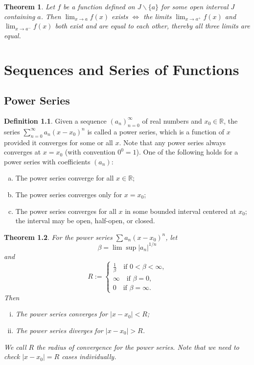 \documentclass[12pt, lettersize]{book}
\theoremstyle{plain}
\newtheorem{thm}{Theorem}[section]
\theoremstyle{definition}
\newtheorem{dfn}[thm]{Definition}
\theoremstyle{remark}
\newcommand{\R}{\mathbb{R}}
\begin{document}
		\begin{thm}\label{def:20.10}
			Let $f$ be a function defined on $J\backslash\{a\}$ for some open interval $J$ containing $a$. Then $\lim_{x\rightarrow a}f(x)$ exists $\iff$ the limits $\lim_{x\rightarrow a^+}f(x)$ and $\lim_{x\rightarrow a^-}f(x)$ both exist and are equal to each other, thereby all three limits are equal.
		\end{thm}
	
	\chapter{Sequences and Series of Functions}
	\newpage
		\section{Power Series}
		\begin{dfn}
			Given a sequence $(a_n)_{n=0}^{\infty}$ of real numbers and $x_0\in\R$, the series $\sum_{n=0}^{\infty}a_n(x-x_0)^n$ is called 
			a power series, which is a function of $x$ provided it converges for some or all $x$. Note  that any power series always converges at $x=x_0$ (with convention $0^0=1$). One of the following
			holds for a power series with coefficients $(a_n)$:
			\begin{enumerate}[(a)]
				\item The power series converge for all $x\in\R$;
				\item The power series converges only for $x=x_0$;
				\item The power series converges for all $x$ in some bounded interval centered at $x_0$; the interval may be
				open, half-open, or closed.
			\end{enumerate}
		\end{dfn}
		
		\begin{thm}\label{def:23.1}
			For the power series $\sum a_n(x-x_0)^n$, let
			\begin{displaymath}
				\beta=\lim\sup |a_n|^{1/n}
			\end{displaymath}
			and
			\begin{displaymath}
				R:=\begin{cases}
					\frac{1}{\beta}\quad\text{if $0<\beta<\infty$,}\\
					\infty\quad\text{if $\beta=0$,}\\
					0\quad\text{if $\beta=\infty$.}
				\end{cases}
			\end{displaymath} Then
			\begin{enumerate}[(i)]
				\item The power series converges for $|x-x_0|<R$;
				\item The power series diverges for $|x-x_0|>R$. 
			\end{enumerate}
			We call $R$ the \emph{radius of convergence} for the power series. Note that we need to check $|x-x_0|=R$ cases individually.
		\end{thm}
		
\end{document}
